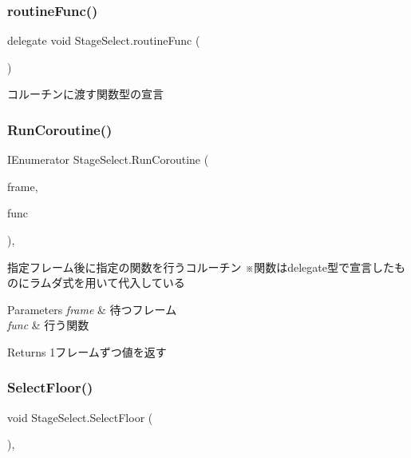 \subsubsection{\texorpdfstring{routine\+Func()}{routineFunc()}}
{\footnotesize\ttfamily delegate void Stage\+Select.\+routine\+Func (\begin{DoxyParamCaption}{ }\end{DoxyParamCaption})\hspace{0.3cm}{\ttfamily [private]}}



コルーチンに渡す関数型の宣言 

\mbox{\label{class_stage_select_ab76ca4f38ca97ab7afbacc44efb99ef2}} 
\subsubsection{\texorpdfstring{Run\+Coroutine()}{RunCoroutine()}}
{\footnotesize\ttfamily I\+Enumerator Stage\+Select.\+Run\+Coroutine (\begin{DoxyParamCaption}\item[{int}]{frame,  }\item[{\hyperlink{class_stage_select_a6b3980abcd91e390c76fc5f914554bbe}{routine\+Func}}]{func }\end{DoxyParamCaption})\hspace{0.3cm}{\ttfamily [inline]}, {\ttfamily [private]}}



指定フレーム後に指定の関数を行うコルーチン ※関数はdelegate型で宣言したものにラムダ式を用いて代入している 


\begin{DoxyParams}{Parameters}
{\em frame} & 待つフレーム\\
\hline
{\em func} & 行う関数\\
\hline
\end{DoxyParams}
\begin{DoxyReturn}{Returns}
1フレームずつ値を返す
\end{DoxyReturn}
\mbox{\label{class_stage_select_aa194326736d1553ee134ad21d90ab832}} 
\subsubsection{\texorpdfstring{Select\+Floor()}{SelectFloor()}}
{\footnotesize\ttfamily void Stage\+Select.\+Select\+Floor (\begin{DoxyParamCaption}{ }\end{DoxyParamCaption})\hspace{0.3cm}{\ttfamily [inline]}, {\ttfamily [private]}}




